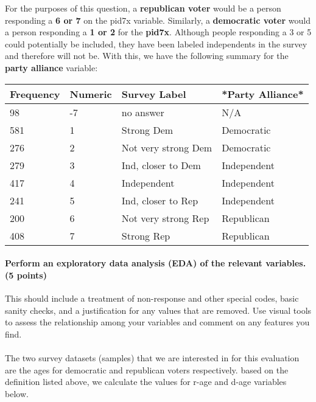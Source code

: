 \documentclass[12pt]{article}
\begin{document}
For the purposes of this question, a \textbf{republican voter} would be a person responding a \textbf{6 or 7} on the pid7x variable. Similarly, a \textbf{democratic voter} would a person responding a \textbf{1 or 2} for the \textbf{pid7x}. Although people responding a 3 or 5 could potentially be included, they have been labeled independents in the survey and therefore will not be. With this, we have the following summary for the \textbf{party alliance} variable:

\begin{table}[H]
    \centering
    \begin{tabular}{|l|l|l|l|}
    \hline
        Frequency & Numeric & Survey Label & *Party Alliance* \\ \hline
        98 & -7 & no answer & N/A  \\ \hline
        581 & 1 & Strong Dem & Democratic  \\ \hline
        276 & 2 & Not very strong Dem & Democratic  \\ \hline
        279 & 3 & Ind, closer to Dem & Independent  \\ \hline
        417 & 4 & Independent & Independent  \\ \hline
        241 & 5 & Ind, closer to Rep & Independent  \\ \hline
        200 & 6 & Not very strong Rep & Republican  \\ \hline
        408 & 7 & Strong Rep & Republican  \\ \hline
    \end{tabular}
\end{table}

\paragraph{Perform an exploratory data analysis (EDA) of the relevant variables. (5 points)}
This should include a treatment of non-response and other special codes, basic sanity checks, and a justification for any values that are removed.  Use visual tools to assess the relationship among your variables and comment on any features you find.

\paragraph{}
The two survey datasets (samples) that we are interested in for this evaluation are the ages for democratic and republican voters respectively. based on the definition listed above, we calculate the values for r-age and d-age variables below. 
\end{document}
